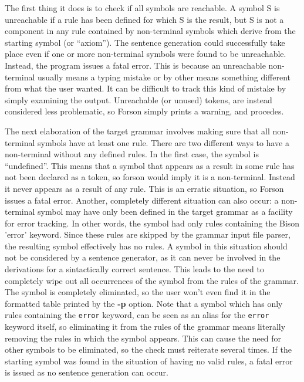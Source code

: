 \documentclass[a4paper,12pt]{article}
\begin{document}
The first thing it does is to check if all symbols are reachable.
A symbol S is unreachable if a rule has been defined for which S is the result, but S is not a component in any rule contained by non-terminal symbols which derive from the starting symbol (or ``axiom'').
The sentence generation could successfully take place even if one or more non-terminal symbols were found to be unreachable. Instead, the program issues a fatal error. This is because an unreachable non-terminal usually means a typing mistake or by other means something different from what the user wanted. It can be difficult to track this kind of mistake by simply examining the output.
Unreachable (or unused) tokens, are instead considered less problematic, so Forson simply prints a warning, and procedes.

The next elaboration of the target grammar involves making sure that all non-terminal symbols have at least one rule. There are two different ways to have a non-terminal without any defined rules.
In the first case, the symbol is ``undefined''. This means that a symbol that appears as a result in some rule has not been declared as a token, so forson would imply it is a non-terminal. Instead it never appears as a result of any rule. This is an erratic situation, so Forson issues a fatal error.
Another, completely different situation can also occur: a non-terminal symbol may have only been defined in the target grammar as a facility for error tracking. In other words, the symbol had only rules containing the Bison 'error' keyword. Since these rules are skipped by the grammar input file parser, the resulting symbol effectively has no rules. A symbol in this situation should not be considered by a sentence generator, as it can never be involved in the derivations for a sintactically correct sentence. This leads to the need to completely wipe out all occurrences of the symbol from the rules of the grammar. The symbol is completely eliminated, so the user won't even find it in the formatted table printed by the \textbf{-p} option.
Note that a symbol which has only rules containing the \verb/error/ keyword, can be seen as an alias for the \verb/error/ keyword itself, so eliminating it from the rules of the grammar means literally removing the rules in which the symbol appears. This can cause the need for other symbols to be eliminated, so the check must reiterate several times.
If the starting symbol was found in the situation of having no valid rules, a fatal error is issued as no sentence generation can occur.
\end{document}

